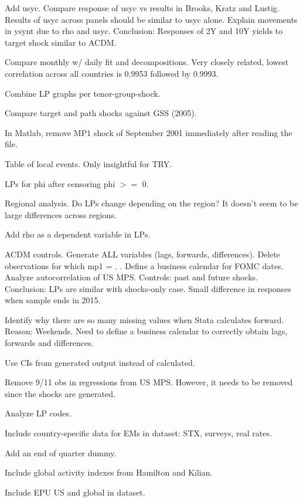 \documentclass[12pt]{article}
\newcommand{\cmark}{\ding{51}}
\newcommand{\done}{\rlap{$\square$}{\raisebox{2pt}{\large\hspace{1pt}\cmark}}%
	\hspace{-2.5pt}}
\begin{document}
\begin{todolist}
	\item[\done] Add usyc. Compare response of usyc vs results in Brooks, Kratz and Lustig. Results of usyc across panels should be similar to usyc alone. Explain movements in ysynt due to rho and usyc. Conclusion: Responses of 2Y and 10Y yields to target shock similar to ACDM.
	\item Compare monthly w/ daily fit and decompositions. Very closely related, lowest correlation across all countries is 0.9953 followed by 0.9993.
	\item[\done] Combine LP graphs per tenor-group-shock.
	\item[\done] Compare target and path shocks against GSS (2005).
	\item[\done] In Matlab, remove MP1 shock of September 2001 immediately after reading the file.
	\item[\done] Table of local events. Only insightful for TRY.
	\item[\done] LPs for phi after censoring phi \(>=\) 0.
	\item Regional analysis. Do LPs change depending on the region? It doesn't seem to be large differences across regions.
	\item[\done] Add rho as a dependent variable in LPs.
	\item[\done] ACDM controls. Generate ALL variables (lags, forwards, differences). Delete observations for which mp1 = . . Define a business calendar for FOMC dates. Analyze autocorrelation of US MPS. Controls: past and future shocks. Conclusion: LPs are similar with shocks-only case. Small difference in responses when sample ends in 2015.
	\item[\done] Identify why there are so many missing values when Stata calculates forward. Reason: Weekends. Need to define a business calendar to correctly obtain lags, forwards and differences.
	\item[\done] Use CIs from generated output instead of calculated.
	\item[\done] Remove 9/11 obs in regressions from US MPS. However, it needs to be removed since the shocks are generated.
	\item[\done] Analyze LP codes.
	\item[\done] Include country-specific data for EMs in dataset: STX, surveys, real rates.
	\item[\done] Add an end of quarter dummy.
	\item[\done] Include global activity indexes from Hamilton and Kilian.
	\item[\done] Include EPU US and global in dataset.

\end{todolist}
\end{document}
